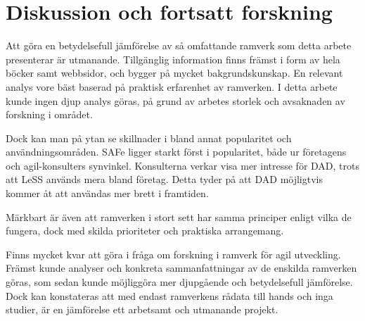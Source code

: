 		
		
			
				
\section{Diskussion och fortsatt forskning}

	Att göra en betydelsefull jämförelse av så omfattande ramverk som detta arbete presenterar är utmanande. Tillgänglig information finns främst i form av hela böcker samt webbsidor, och bygger på mycket bakgrundskunskap. En relevant analys vore bäst baserad på praktisk erfarenhet av ramverken.
	I detta arbete kunde ingen djup analys göras, på grund av arbetes storlek och avsaknaden av forskning i området.
	
	
	Dock kan man på ytan se skillnader i bland annat popularitet och användningsområden. SAFe ligger starkt först i popularitet, både ur företagens och agil-konsulters synvinkel.
	Konsulterna verkar visa mer intresse för DAD, trots att LeSS används mera bland företag. Detta tyder på att DAD möjligtvis kommer åt att användas mer brett i framtiden.
	
	
	Märkbart är även att ramverken i stort sett har samma principer enligt vilka de fungera, dock med skilda prioriteter och praktiska arrangemang.
	
	
	Finns mycket kvar att göra i fråga om forskning i ramverk för agil utveckling. Främst kunde analyser och konkreta sammanfattningar av de enskilda ramverken göras, som sedan kunde möjliggöra mer djupgående och betydelsefull jämförelse. Dock kan konstateras att med endast ramverkens rådata till hands och inga studier, är en jämförelse ett arbetsamt och utmanande projekt.
	





	